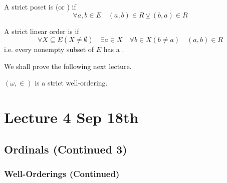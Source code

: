\documentclass[notoc,notitlepage]{tufte-book}
\begin{document}
\begin{defn}
\label{defn:strict_totally_ordered_set}
  A strict poset is  (or ) if
  \begin{equation*}
    \forall a, b \in E \quad (a, b) \in R \veebar (b, a) \in R
  \end{equation*}
\end{defn}

\begin{defn}
\label{defn:well_order}
  A strict linear order is  if
  \begin{equation*}
    \forall X \subseteq E ( X \neq \emptyset ) \quad \exists a \in X \quad \forall b \in X ( b \neq a ) \quad (a, b) \in R
  \end{equation*}
  i.e. every nonempty subset of $E$ has a .
\end{defn}

We shall prove the following next lecture.

\begin{propononum}
  $(\omega, \in)$ is a strict well-ordering.
\end{propononum}




\chapter{Lecture 4 Sep 18th}%
\label{chp:lecture_4_sep_18th}

\section{Ordinals (Continued 3)}%
\label{sec:ordinals_continued_3}

\subsection{Well-Orderings (Continued)}%
\label{sub:well_orderings_continued}
\end{document}

